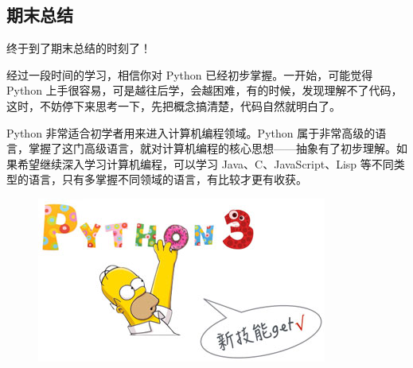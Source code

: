 \hypertarget{ux671fux672bux603bux7ed3}{%
\subsection{期末总结}\label{ux671fux672bux603bux7ed3}}

终于到了期末总结的时刻了！

经过一段时间的学习，相信你对 Python 已经初步掌握。一开始，可能觉得
Python
上手很容易，可是越往后学，会越困难，有的时候，发现理解不了代码，这时，不妨停下来思考一下，先把概念搞清楚，代码自然就明白了。

Python 非常适合初学者用来进入计算机编程领域。Python
属于非常高级的语言，掌握了这门高级语言，就对计算机编程的核心思想------抽象有了初步理解。如果希望继续深入学习计算机编程，可以学习
Java、C、JavaScript、Lisp
等不同类型的语言，只有多掌握不同领域的语言，有比较才更有收获。

 
 \begin{figure}[htp]
	\centering
	\includegraphics[width=0.6\linewidth]{fig/1018496437713568l.png}
\end{figure}


